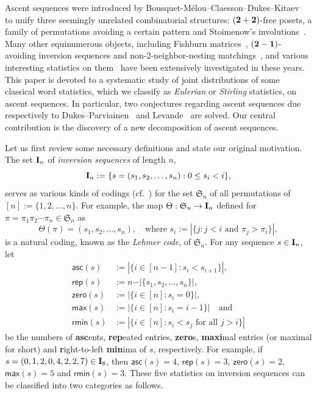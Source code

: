 \documentclass[12pt]{amsart}
\theoremstyle{plain}
\theoremstyle{definition}
\theoremstyle{example}
\theoremstyle{remark}
\numberwithin{equation}{section}
\numberwithin{figure}{section}
\newcommand{\asc}{\mathsf{asc}}
\def\max{\mathsf{max}}
\def\zero{\mathsf{zero}}
\def\rep{\mathsf{rep}}
\def\rmin{\mathsf{rmin}}
\def\I{\operatorname{{\bf I}}}
\def\S{\mathfrak{S}}
\begin{document}
Ascent sequences were introduced by Bousquet-M\'elou--Claesson--Dukes--Kitaev~\cite{bcdk}
to unify three seemingly unrelated  combinatorial structures: $({\bf2+2})$-free posets, a family of
permutations avoiding a certain pattern and Stoimenow's involutions~\cite{sto,zag}.
Many other  equinumerous objects, including Fishburn matrices~\cite{dp,je,yan}, $({\bf2-1})$-avoiding inversion sequences and non-$2$-neighbor-nesting matchings~\cite{cl,lev}, and various  interesting statistics on them~\cite{dp,dkrs,je2,kr2,kr} have been extensively investigated in these years. This paper is devoted to a systematic study of joint distributions of some classical word statistics, which we classify as {\em Eulerian} or {\em Stirling} statistics, on ascent sequences. In particular, two conjectures regarding ascent sequences due  respectively to Dukes--Parviainen~\cite{dp} and Levande~\cite{lev}  are solved. Our central contribution is the discovery of a new  decomposition of ascent sequences.

Let us first review some necessary definitions and state our original motivation. The set $\I_n$ of {\em inversion sequences}  of length $n$,
$$
\I_n:=\{s=(s_1,s_2,\ldots, s_n): 0\leq s_i<i\},
$$
serves as various kinds of codings (cf.~\cite{bv,fo,kl,leh}) for the set $\S_n$ of all permutations of $[n]:=\{1,2,\ldots,n\}$. For example, the map $\Theta:\S_n\rightarrow\I_n$ defined for $\pi=\pi_1\pi_2\cdots\pi_n\in\S_n$ as
 $$
 \Theta(\pi)=(s_1,s_2,\ldots,s_n),\quad\text{where $s_i:=\left|\{j: \text{$j<i$ and $\pi_j>\pi_i$}\}\right|$},
 $$
 is a natural coding, known as the {\em Lehmer code}, of $\S_n$. For any sequence $s\in\I_n$, let
\begin{align*}
\asc(s)&:=|\{i\in[n-1]: s_i<s_{i+1}\}|,\\
\rep(s)&:=n-\vert\{s_1,s_2,\ldots,s_n\}\vert,\\
\zero(s)&:=\vert\{i\in[n]: s_i=0\}\vert,\\
\max(s)&:=\vert\{i\in[n]:s_i=i-1\}\vert\quad\text{and}\\
\rmin(s)&:=|\{i\in[n]: s_i<s_j\text{ for all $j>i$}\}|
\end{align*}
be the numbers of {\bf asc}ents, {\bf rep}eated entries,  {\bf zero}s, {\bf maxi}mal entries (or maximal for short) and {\bf r}ight-to-left {\bf min}ima of $s$, respectively. For example, if $s=(0,1,2,0,4,2,2,7)\in\I_8$, then $\asc(s)=4$, $\rep(s)=3$, $\zero(s)=2$, $\max(s)=5$ and $\rmin(s)=3$.  These five statistics on inversion sequences can be classified into two categories as follows.
\end{document}
